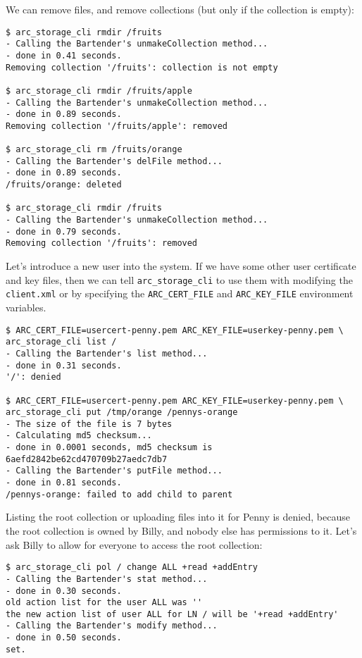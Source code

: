 \documentclass{book}
\begin{document}
We can remove files, and remove collections (but only if the collection is empty):

\begin{verbatim}
$ arc_storage_cli rmdir /fruits
- Calling the Bartender's unmakeCollection method...
- done in 0.41 seconds.
Removing collection '/fruits': collection is not empty

$ arc_storage_cli rmdir /fruits/apple
- Calling the Bartender's unmakeCollection method...
- done in 0.89 seconds.
Removing collection '/fruits/apple': removed

$ arc_storage_cli rm /fruits/orange
- Calling the Bartender's delFile method...
- done in 0.89 seconds.
/fruits/orange: deleted

$ arc_storage_cli rmdir /fruits
- Calling the Bartender's unmakeCollection method...
- done in 0.79 seconds.
Removing collection '/fruits': removed
\end{verbatim}

Let's introduce a new user into the system. If we have some other user certificate and key files, then we can tell \verb!arc_storage_cli! to use them with modifying the \verb!client.xml! or by specifying the \verb!ARC_CERT_FILE! and \verb!ARC_KEY_FILE! environment variables.

\begin{verbatim}
$ ARC_CERT_FILE=usercert-penny.pem ARC_KEY_FILE=userkey-penny.pem \
arc_storage_cli list /
- Calling the Bartender's list method...
- done in 0.31 seconds.
'/': denied

$ ARC_CERT_FILE=usercert-penny.pem ARC_KEY_FILE=userkey-penny.pem \
arc_storage_cli put /tmp/orange /pennys-orange
- The size of the file is 7 bytes
- Calculating md5 checksum...
- done in 0.0001 seconds, md5 checksum is 6aefd2842be62cd470709b27aedc7db7
- Calling the Bartender's putFile method...
- done in 0.81 seconds.
/pennys-orange: failed to add child to parent

\end{verbatim}

Listing the root collection or uploading files into it for Penny is denied, because the root collection is owned by Billy, and nobody else has permissions to it. Let's ask Billy to allow for everyone to access the root collection:

\begin{verbatim}
$ arc_storage_cli pol / change ALL +read +addEntry
- Calling the Bartender's stat method...
- done in 0.30 seconds.
old action list for the user ALL was ''
the new action list of user ALL for LN / will be '+read +addEntry'
- Calling the Bartender's modify method...
- done in 0.50 seconds.
set.
\end{verbatim}
\end{document}
